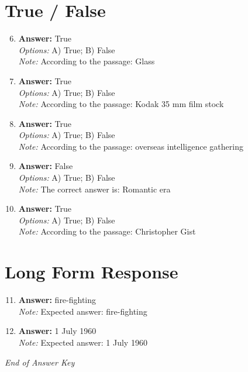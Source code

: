 \documentclass[12pt]{article}
\begin{document}
\section*{True / False}
\begin{enumerate}[label=\arabic*.]
\setcounter{enumi}{5}
\item \textbf{Answer:} True
\\ \textit{Options:} A) True; B) False
\\ \textit{Note:} According to the passage: Glass
\item \textbf{Answer:} True
\\ \textit{Options:} A) True; B) False
\\ \textit{Note:} According to the passage: Kodak 35 mm film stock
\item \textbf{Answer:} True
\\ \textit{Options:} A) True; B) False
\\ \textit{Note:} According to the passage: overseas intelligence gathering
\item \textbf{Answer:} False
\\ \textit{Options:} A) True; B) False
\\ \textit{Note:} The correct answer is: Romantic era
\item \textbf{Answer:} True
\\ \textit{Options:} A) True; B) False
\\ \textit{Note:} According to the passage: Christopher Gist
\end{enumerate}

\section*{Long Form Response}
\begin{enumerate}[label=\arabic*.]
\setcounter{enumi}{10}
\item \textbf{Answer:} fire-fighting
\\ \textit{Note:} Expected answer: fire-fighting
\item \textbf{Answer:} 1 July 1960
\\ \textit{Note:} Expected answer: 1 July 1960
\end{enumerate}

\vfill
\noindent\textit{End of Answer Key}
\end{document}
